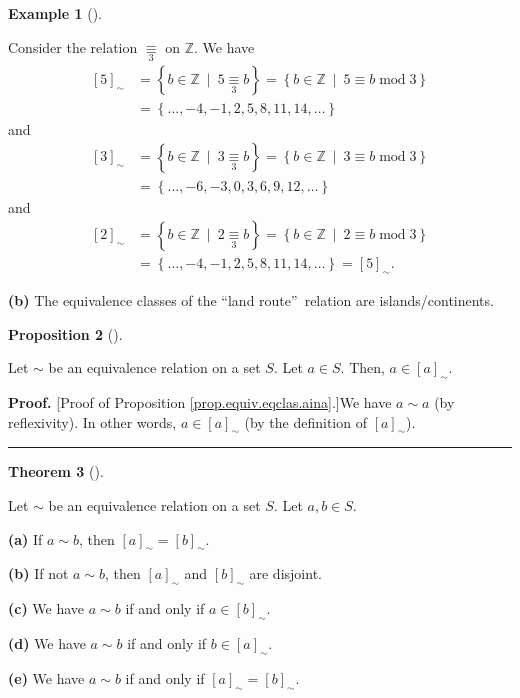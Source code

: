 \documentclass[numbers=enddot,12pt,final,onecolumn,notitlepage]{scrartcl}%
\numberwithin{exer}{subsection}
\theoremstyle{definition}
\newtheorem{theo}{Theorem}[subsection]
\newenvironment{theorem}[1][]
{\begin{theo}[#1]\begin{leftbar}}
{\end{leftbar}\end{theo}}
\newtheorem{prop}[theo]{Proposition}
\newenvironment{proposition}[1][]
{\begin{prop}[#1]\begin{leftbar}}
{\end{leftbar}\end{prop}}
\newtheorem{exam}[theo]{Example}
\newenvironment{example}[1][]
{\begin{exam}[#1]\begin{leftbar}}
{\end{leftbar}\end{exam}}
\newenvironment{proof}[1][Proof]{\noindent\textbf{#1.} }{\ \rule{0.5em}{0.5em}}
\begin{document}
\begin{example}
Consider the relation $\underset{3}{\equiv}$ on $\mathbb{Z}$. We have%
\begin{align*}
\left[  5\right]  _{\sim}  &  =\left\{  b\in\mathbb{Z}\ \mid
\ 5\underset{3}{\equiv}b\right\}  =\left\{  b\in\mathbb{Z}\ \mid\ 5\equiv
b\operatorname{mod}3\right\} \\
&  =\left\{  \ldots,-4,-1,2,5,8,11,14,\ldots\right\}
\end{align*}
and%
\begin{align*}
\left[  3\right]  _{\sim}  &  =\left\{  b\in\mathbb{Z}\ \mid
\ 3\underset{3}{\equiv}b\right\}  =\left\{  b\in\mathbb{Z}\ \mid\ 3\equiv
b\operatorname{mod}3\right\} \\
&  =\left\{  \ldots,-6,-3,0,3,6,9,12,\ldots\right\}
\end{align*}
and%
\begin{align*}
\left[  2\right]  _{\sim}  &  =\left\{  b\in\mathbb{Z}\ \mid
\ 2\underset{3}{\equiv}b\right\}  =\left\{  b\in\mathbb{Z}\ \mid\ 2\equiv
b\operatorname{mod}3\right\} \\
&  =\left\{  \ldots,-4,-1,2,5,8,11,14,\ldots\right\}  =\left[  5\right]
_{\sim}.
\end{align*}


\textbf{(b)} The equivalence classes of the \textquotedblleft land
route\textquotedblright\ relation are islands/continents.
\end{example}

\begin{proposition}
\label{prop.equiv.eqclas.aina}Let $\sim$ be an equivalence relation on a set
$S$. Let $a\in S$. Then, $a\in\left[  a\right]  _{\sim}$.
\end{proposition}

\begin{proof}
[Proof of Proposition \ref{prop.equiv.eqclas.aina}.]We have $a\sim a$ (by
reflexivity). In other words, $a\in\left[  a\right]  _{\sim}$ (by the
definition of $\left[  a\right]  _{\sim}$).
\end{proof}

\begin{theorem}
\label{thm.equiv.eqclas.disj}Let $\sim$ be an equivalence relation on a set
$S$. Let $a,b\in S$.

\textbf{(a)} If $a\sim b$, then $\left[  a\right]  _{\sim}=\left[  b\right]
_{\sim}$.

\textbf{(b)} If not $a\sim b$, then $\left[  a\right]  _{\sim}$ and $\left[
b\right]  _{\sim}$ are disjoint.

\textbf{(c)} We have $a\sim b$ if and only if $a\in\left[  b\right]  _{\sim}$.

\textbf{(d)} We have $a\sim b$ if and only if $b\in\left[  a\right]  _{\sim}$.

\textbf{(e)} We have $a\sim b$ if and only if $\left[  a\right]  _{\sim
}=\left[  b\right]  _{\sim}$.
\end{theorem}
\end{document}
